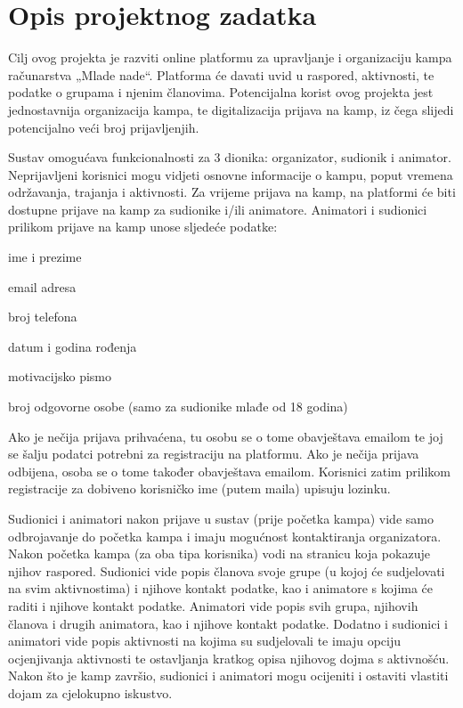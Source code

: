 \chapter{Opis projektnog zadatka}
			
		Cilj ovog projekta je razviti online platformu za upravljanje i organizaciju kampa računarstva „Mlade nade“. Platforma će davati uvid u raspored, aktivnosti, te podatke o grupama i njenim članovima. Potencijalna korist ovog projekta jest jednostavnija organizacija kampa, te digitalizacija prijava na kamp, iz čega slijedi potencijalno veći broj prijavljenjih.
		
		Sustav omogućava funkcionalnosti za 3 dionika: organizator, sudionik i animator. Neprijavljeni korisnici mogu vidjeti osnovne informacije o kampu, poput vremena održavanja, trajanja i aktivnosti. Za vrijeme prijava na kamp, na platformi će biti dostupne prijave na kamp za sudionike i/ili animatore. Animatori i sudionici prilikom prijave na kamp unose sljedeće podatke:
		\begin{packed_item}
			\item ime i prezime
			\item email adresa
			\item broj telefona
			\item datum i godina rođenja
			\item motivacijsko pismo
			\item broj odgovorne osobe (samo za sudionike mlađe od 18 godina)
		\end{packed_item}
	
		Ako je nečija prijava prihvaćena, tu osobu se o tome obavještava emailom te joj se šalju podatci potrebni za registraciju na platformu. Ako je nečija prijava odbijena, osoba se o tome također obavještava emailom. Korisnici zatim prilikom registracije za dobiveno korisničko ime (putem maila) upisuju lozinku.
		
		Sudionici i animatori nakon prijave u sustav (prije početka kampa) vide samo odbrojavanje do početka kampa i imaju mogućnost kontaktiranja organizatora. Nakon početka kampa (za oba tipa korisnika) vodi na stranicu koja pokazuje njihov raspored. Sudionici vide popis članova svoje grupe (u kojoj će sudjelovati na svim aktivnostima) i njihove kontakt podatke, kao i animatore s kojima će raditi i njihove kontakt podatke. Animatori vide popis svih grupa, njihovih članova i drugih animatora, kao i njihove kontakt podatke. Dodatno i sudionici i animatori vide popis aktivnosti na kojima su sudjelovali te imaju opciju ocjenjivanja aktivnosti te ostavljanja kratkog opisa njihovog dojma s aktivnošću. Nakon što je kamp završio, sudionici i animatori mogu ocijeniti i ostaviti vlastiti dojam za cjelokupno iskustvo. 
		
